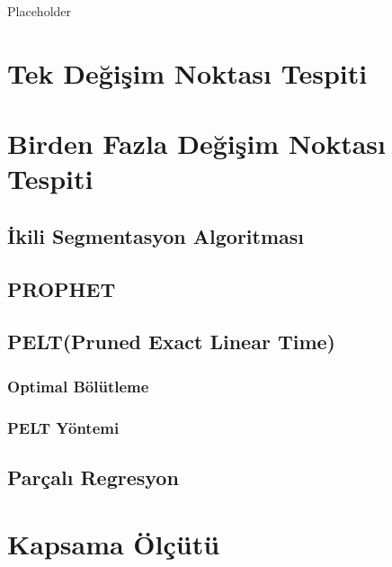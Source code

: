 \documentclass[12pt,twoside]{deuthesis}
\begin{document}
Placeholder

\hypertarget{tek-deux11fiux15fim-noktasux131-tespiti}{%
\section{Tek Değişim Noktası Tespiti}\label{tek-deux11fiux15fim-noktasux131-tespiti}}

\hypertarget{birden-fazla-deux11fiux15fim-noktasux131-tespiti}{%
\section{Birden Fazla Değişim Noktası Tespiti}\label{birden-fazla-deux11fiux15fim-noktasux131-tespiti}}

\hypertarget{ikili-segmentasyon-algoritmasux131}{%
\subsection{İkili Segmentasyon Algoritması}\label{ikili-segmentasyon-algoritmasux131}}

\hypertarget{prophet}{%
\subsection{PROPHET}\label{prophet}}

\hypertarget{peltpruned-exact-linear-time}{%
\subsection{PELT(Pruned Exact Linear Time)}\label{peltpruned-exact-linear-time}}

\hypertarget{optimal-buxf6luxfctleme}{%
\subsubsection{Optimal Bölütleme}\label{optimal-buxf6luxfctleme}}

\hypertarget{pelt-yuxf6ntemi}{%
\subsubsection{PELT Yöntemi}\label{pelt-yuxf6ntemi}}

\hypertarget{paruxe7alux131-regresyon}{%
\subsection{Parçalı Regresyon}\label{paruxe7alux131-regresyon}}

\hypertarget{kapsama-uxf6luxe7uxfctuxfc}{%
\section{Kapsama Ölçütü}\label{kapsama-uxf6luxe7uxfctuxfc}}
\end{document}
